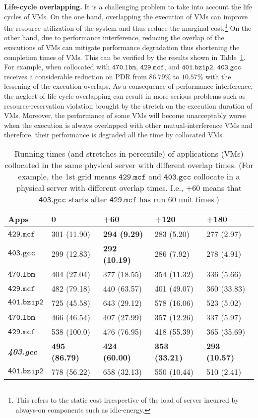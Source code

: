 \documentclass[10pt,journal]{IEEEtran}
\begin{document}
\textbf{Life-cycle overlapping.} 
It is a challenging problem to take into account the life cycles of VMs. On the one hand, overlapping the execution of VMs can improve the resource utilization of the system and thus reduce the marginal cost.\footnote{This refers to the static cost irrespective of the load of server incurred by always-on components such as idle-energy.} On the other hand, due to performance interference, reducing the overlap of the executions of VMs can mitigate performance degradation thus shortening the completion times of VMs. This can be verified by the results shown in Table~\ref{tb:temporal}. For example, when collocated with $\mathtt{470.lbm}$, $\mathtt{429.mcf}$, and $\mathtt{401.bzip2}$, $\mathtt{403.gcc}$ receives a considerable reduction on PDR from $86.79\%$ to $10.57\%$ with the lessening of the execution overlaps. As a consequence of performance interference, the neglect of life-cycle overlapping can result in more serious problems such as resource-reservation violation brought by the stretch on the execution duration of VMs. Moreover, the performance of some VMs will become unacceptably worse when the execution is always overlapped with other mutual-interference VMs and therefore, their performance is degraded all the time by collocated VMs.

\begin{table}[!t]
\centering
\caption{\label{tb:temporal}Running times (and stretches in percentile) of applications (VMs) collocated in the same physical server with different overlap times. (For example, the 1st grid means $\mathtt{429.mcf}$ and $\mathtt{403.gcc}$ collocate in a physical server with different overlap times. I.e., $+60$ means that $\mathtt{403.gcc}$ starts after $\mathtt{429.mcf}$ has run 60 unit times.)}
\begin{tabular}{p{1.0cm}p{1.32cm}p{1.32cm}p{1.32cm}p{1.32cm}}\hline\hline {\bf Apps}	&	0&	+60&		+120	&	+180\\\hline
$\mathtt{429.mcf}$&	301 (11.90)&	{\bf 	294 (9.29)}&	283 (5.20)&	277 (2.97)\\
$\mathtt{403.gcc}$&	299 (12.83)&	{\bf 	292 (10.19)}&286 (7.92)&	278 (4.91)\\\hline
$\mathtt{470.lbm}$&	404 (27.04)&		377 (18.55)&	354 (11.32)&	336 (5.66)\\
$\mathtt{429.mcf}$&	482 (79.18)&		440 (63.57)&	401 (49.07)&	360 (33.83)\\
$\mathtt{401.bzip2}$& 725 (45.58)&		643 (29.12)&	578 (16.06)&	523 (5.02)\\\hline
$\mathtt{470.lbm}$&	466 (46.54)&		407 (27.99)&	357 (12.26)&	337 (5.97)\\
$\mathtt{429.mcf}$&	538 (100.0)&		476 (76.95)&	418 (55.39)&	365 (35.69)\\
\textbf{\textit{403.gcc}}&	{\bf 495 (86.79)}&		{\bf 424 (60.00)}&	{\bf 353 (33.21)}&	{\bf 293 (10.57)}\\
$\mathtt{401.bzip2}$&	778 (56.22)&		658 (32.13)&	550 (10.44)&	510 (2.41)\\\hline\hline
\end{tabular}
\end{table}
\end{document}
